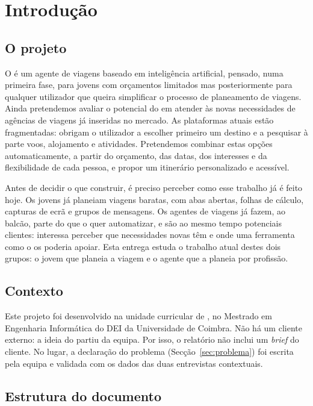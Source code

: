 \section{Introdução}\label{sec:introducao}

\subsection{O projeto \projeto}

O \projeto{} é um agente de viagens baseado em inteligência artificial, 
pensado, numa primeira fase, para jovens com orçamentos limitados
mas posteriormente para qualquer utilizador que queira simplificar o processo de planeamento de viagens. 
Ainda pretendemos avaliar o potencial do \projeto{} em atender às novas necessidades de agências de viagens já 
inseridas no mercado. As plataformas atuais 
estão fragmentadas: obrigam o utilizador a escolher primeiro um destino e a 
pesquisar à parte voos, alojamento e atividades. Pretendemos combinar 
estas opções automaticamente, a partir do orçamento, das datas, dos interesses 
e da flexibilidade de cada pessoa, e propor um itinerário personalizado e 
acessível.

Antes de decidir o que construir, é preciso perceber como esse trabalho já é
feito hoje. Os jovens já planeiam viagens baratas, com abas abertas, folhas
de cálculo, capturas de ecrã e grupos de mensagens. Os agentes de viagens já
fazem, ao balcão, parte do que o \projeto{} quer automatizar, e são ao mesmo tempo
potenciais clientes: interessa perceber que necessidades novas têm e onde uma ferramenta
como o \projeto{} os poderia apoiar. Esta entrega estuda o trabalho atual destes dois
grupos: o jovem que planeia a viagem e o agente que a planeia por profissão.

\subsection{Contexto}

Este projeto foi desenvolvido na unidade curricular de \uc{}, no Mestrado em Engenharia Informática do DEI da Universidade de Coimbra. 
Não há um cliente externo: a ideia do \projeto{} partiu da equipa. Por isso, o relatório não inclui um \textit{brief} do cliente. 
No lugar, a declaração do problema (Secção~\ref{sec:problema}) foi escrita pela equipa e validada com os dados das duas entrevistas contextuais.


\subsection{Estrutura do documento}

